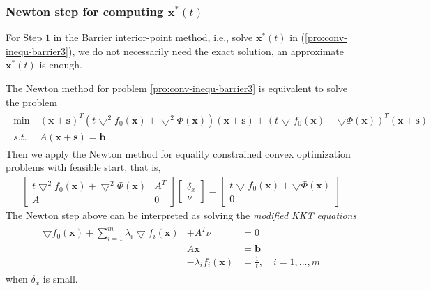 \subsubsection{Newton step for computing $\mathbf{x}^*(t)$}
For Step $1$ in the Barrier interior-point method, i.e.,
solve $\mathbf{x}^*(t)$ in (\ref{pro:conv-inequ-barrier3}),
we do not necessarily need the exact solution, an approximate
$\mathbf{x}^*(t)$ is enough.
\par
The Newton method for problem \ref{pro:conv-inequ-barrier3}
is equivalent to solve the problem
\begin{align}
    \begin{array}{ll}
        \min \ &(\mathbf{x}+\mathbf{s})^T (t\bigtriangledown^2 f_0(\mathbf{x})
        + \bigtriangledown^2 \Phi(\mathbf{x}))(\mathbf{x}+\mathbf{s}) + 
        (t\bigtriangledown f_0(\mathbf{x}) + \bigtriangledown \Phi(\mathbf{x}))^T
        (\mathbf{x} + \mathbf{s}) \\
        s.t. \ &A(\mathbf{x} + \mathbf{s}) = \mathbf{b}
    \end{array}
\end{align}
Then we apply the Newton method for equality constrained convex optimization
problems with feasible start, that is,
\begin{align}
    \begin{bmatrix}
        t\bigtriangledown^2 f_0(\mathbf{x})
        + \bigtriangledown^2 \Phi(\mathbf{x}) &A^T \\
        A &0
    \end{bmatrix}
    \begin{bmatrix}
        \delta_x \\
        \nu
    \end{bmatrix}
    = \begin{bmatrix}
        t\bigtriangledown f_0(\mathbf{x})
        + \bigtriangledown \Phi(\mathbf{x}) \\
        0
    \end{bmatrix}
\end{align}
The Newton step above can be interpreted as solving
the \emph{modified KKT equations}
\begin{align}
    \begin{array}{lll}
        \bigtriangledown f_0(\mathbf{x}) + \sum_{i=1}^m \lambda_i
        \bigtriangledown f_i(\mathbf{x})& + A^T \nu &= 0 \\
        &A\mathbf{x} &= \mathbf{b} \\
        &-\lambda_if_i(\mathbf{x}) &= \frac{1}{t}, \quad i = 1,...,m
    \end{array}
\end{align}
when $\delta_x$ is small.

